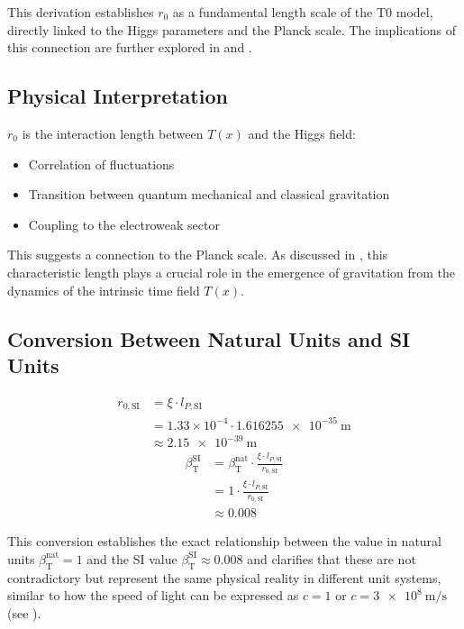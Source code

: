 \documentclass[12pt,a4paper]{article}
\newcommand{\Tfield}{T(x)}
\newcommand{\betaT}{\beta_{\text{T}}}
\begin{document}
	This derivation establishes \(r_0\) as a fundamental length scale of the T0 model, directly linked to the Higgs parameters and the Planck scale. The implications of this connection are further explored in \cite{pascher_planck_2025} and \cite{pascher_higgs_2025}.
	
	\subsection{Physical Interpretation}
	\label{subsec:physical_interpretation}
	
	\(r_0\) is the interaction length between \(\Tfield\) and the Higgs field:
	\begin{itemize}
		\item Correlation of fluctuations
		\item Transition between quantum mechanical and classical gravitation
		\item Coupling to the electroweak sector
	\end{itemize}
	This suggests a connection to the Planck scale. As discussed in \cite{pascher_emergente_gravitation_2025}, this characteristic length plays a crucial role in the emergence of gravitation from the dynamics of the intrinsic time field \(\Tfield\).
	
	\subsection{Conversion Between Natural Units and SI Units}
	\label{subsec:conversion_units}
	
	\begin{align}
		r_{0,\text{SI}} &= \xi \cdot l_{P,\text{SI}} \\
		&= 1.33 \times 10^{-4} \cdot \SI{1.616255e-35}{\meter} \\
		&\approx \SI{2.15e-39}{\meter}
	\end{align}
	\begin{align}
		\betaT^{\text{SI}} &= \betaT^{\text{nat}} \cdot \frac{\xi \cdot l_{P,\text{SI}}}{r_{0,\text{SI}}} \\
		&= 1 \cdot \frac{\xi \cdot l_{P,\text{SI}}}{r_{0,\text{SI}}} \\
		&\approx 0.008
	\end{align}
	
	This conversion establishes the exact relationship between the value in natural units \(\betaT^{\text{nat}} = 1\) and the SI value \(\betaT^{\text{SI}} \approx 0.008\) and clarifies that these are not contradictory but represent the same physical reality in different unit systems, similar to how the speed of light can be expressed as \(c = 1\) or \(c = \SI{3e8}{\meter\per\second}\) (see \cite{pascher_alphabeta_2025}).
	
\end{document}

